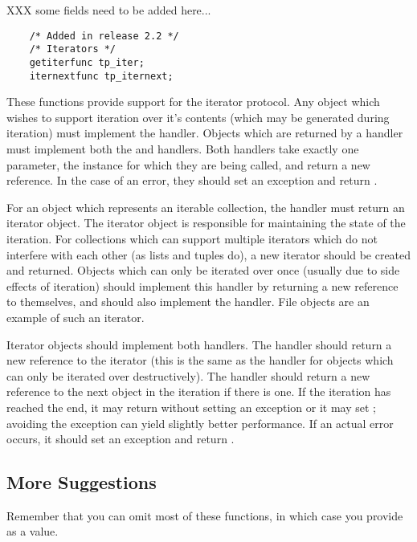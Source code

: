 XXX some fields need to be added here...


\begin{verbatim}
    /* Added in release 2.2 */
    /* Iterators */
    getiterfunc tp_iter;
    iternextfunc tp_iternext;
\end{verbatim}

These functions provide support for the iterator protocol.  Any object
which wishes to support iteration over it's contents (which may be
generated during iteration) must implement the 
handler.  Objects which are returned by a  handler must
implement both the  and  handlers.
Both handlers take exactly one parameter, the instance for which they
are being called, and return a new reference.  In the case of an
error, they should set an exception and return \NULL.

For an object which represents an iterable collection, the
 handler must return an iterator object.  The iterator
object is responsible for maintaining the state of the iteration.  For
collections which can support multiple iterators which do not
interfere with each other (as lists and tuples do), a new iterator
should be created and returned.  Objects which can only be iterated
over once (usually due to side effects of iteration) should implement
this handler by returning a new reference to themselves, and should
also implement the  handler.  File objects are an
example of such an iterator.

Iterator objects should implement both handlers.  The 
handler should return a new reference to the iterator (this is the
same as the  handler for objects which can only be
iterated over destructively).  The  handler should
return a new reference to the next object in the iteration if there is
one.  If the iteration has reached the end, it may return \NULL{}
without setting an exception or it may set ;
avoiding the exception can yield slightly better performance.  If an
actual error occurs, it should set an exception and return \NULL.


\subsection{More Suggestions}

Remember that you can omit most of these functions, in which case you
provide  as a value.

